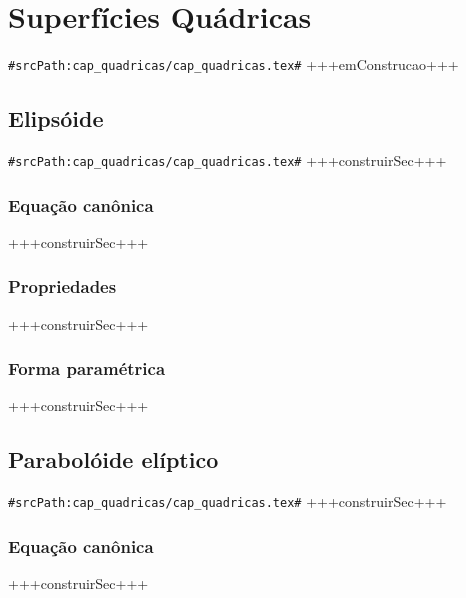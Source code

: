 
\chapter{Superfícies Quádricas}
\verb+#srcPath:cap_quadricas/cap_quadricas.tex#+
\label{chap:quadricas}
+++emConstrucao+++

\section{Elipsóide}
\verb+#srcPath:cap_quadricas/cap_quadricas.tex#+
+++construirSec+++

\subsection{Equação canônica}
+++construirSec+++

\subsection{Propriedades}
+++construirSec+++

\subsection{Forma paramétrica}
+++construirSec+++

\section{Parabolóide elíptico}
\verb+#srcPath:cap_quadricas/cap_quadricas.tex#+
+++construirSec+++

\subsection{Equação canônica}
+++construirSec+++

